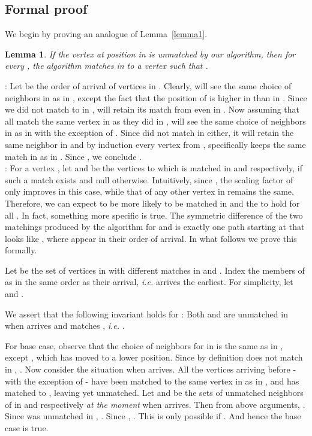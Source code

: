 \documentclass[11pt]{article}
\newtheorem{lemma}[theorem]{Lemma}
\newcommand{\qed}{}
\newenvironment{proof}{\noindent{\em Proof:}}{\hfill \qed \medskip}
\begin{document}
\subsection*{Formal proof}

We begin by proving an analogue of Lemma~\ref{lemma1}.

\begin{lemma}
\label{lemma2}
If the vertex  at position  in  is unmatched by our algorithm, then for every , the algorithm matches  in  to a vertex  such that .
\end{lemma}
\begin{proof} 
: Let  be the order of arrival of vertices in
. Clearly,  will see the same choice of neighbors in
 as in , except the fact that the position of 
is higher in  than in . Since we did not match
 to  in ,  will retain its match from 
even in . Now assuming that  all match the
same vertex in  as they did in ,  will
see the same choice of neighbors in  as in  with
the exception of . Since  did not match  in 
either, it will retain the same neighbor in  and by
induction every vertex from , specifically  keeps the same
match in  as in . Since , we conclude .\\


: For a vertex , let  and  be
the vertices to which  is matched in  and 
respectively, if such a match exists and null otherwise. Intuitively,
since , the scaling factor of  only
improves in this case, while that of any other vertex in  remains
the same. Therefore, we can expect  to be more likely to be matched
in  and the
 to
hold for all . In fact, something more specific is true. The
symmetric difference of the two matchings produced by the algorithm
for  and  is exactly one path starting at  that
looks like ,
where  appear in their order of arrival. In what
follows we prove this formally.



Let  be the
set of vertices in  with different matches in  and
. Index the members of  as  in the same
order as their arrival, \textit{i.e.}  arrives the earliest. For
simplicity, let  and .

We assert that the following invariant holds for :
Both  and  are unmatched in  when 
arrives and  matches , \textit{i.e.} .

For base case, observe that the choice of neighbors for  in
 is the same as in , except , which has moved
to a lower position. Since by definition  does not match  in
, . Now consider the situation when 
arrives. All the vertices arriving before  - with the exception
of  - have been matched to the same vertex in  as in
, and  has matched to , leaving  yet
unmatched. Let  and  be the sets
of unmatched neighbors of  in  and 
respectively \emph{at the moment} when  arrives. Then from above
arguments, . Since  was unmatched in , . Since , . This is only possible if . And hence the base case is true.


\end{proof}
\end{document}
